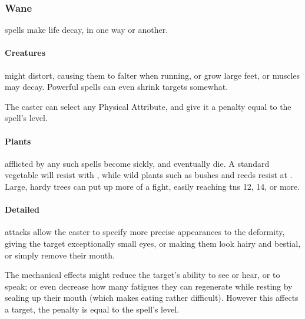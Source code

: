 \begin{multicols}{2}
\subsubsection{Wane}
spells make life decay, in one way or another.

  \paragraph{Creatures}
    might distort, causing them to falter when running, or grow large feet, or muscles may decay.
    Powerful spells can even shrink targets somewhat.

    The caster can select any Physical Attribute, and give it a penalty equal to the spell's level.

  \paragraph{Plants}
    afflicted by any such spells become sickly, and eventually die.
    A standard vegetable will resist with \tn[4], while wild plants such as bushes and reeds resist at \tn[7].
    Large, hardy trees can put up more of a fight, easily reaching \glspl{tn} 12, 14, or more.

  \paragraph{Detailed}
    attacks allow the caster to specify more precise appearances to the deformity, giving the target exceptionally small eyes, or making them look hairy and bestial, or simply remove their mouth.

    The mechanical effects might reduce the target's ability to see or hear, or to speak; or even decrease how many \glspl{fatigue} they can regenerate while resting by sealing up their mouth (which makes eating rather difficult).
    However this affects a target, the penalty is equal to the spell's level.


\end{multicols}
